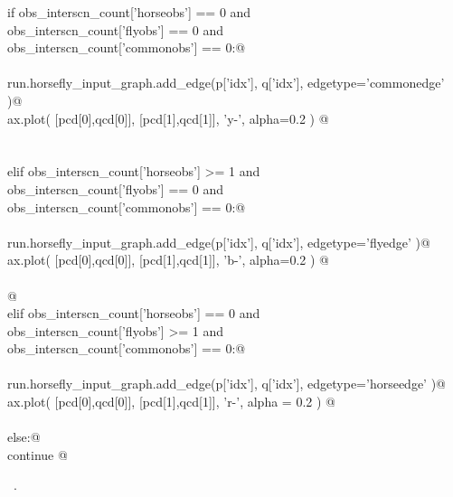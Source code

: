 \documentclass[11.5pt]{report}
\begin{document}
\begin{flushleft}
\begin{minipage}{\linewidth}
\begin{list}{}{}
\mbox{}\verb@             if   obs_interscn_count['horseobs']   == 0  and \@\\
\mbox{}\verb@                obs_interscn_count['flyobs']     == 0  and \@\\
\mbox{}\verb@                obs_interscn_count['commonobs']  == 0:@\\
\mbox{}\verb@@\\
\mbox{}\verb@                run.horsefly_input_graph.add_edge(p['idx'], q['idx'], edgetype='commonedge' )@\\
\mbox{}\verb@                ax.plot( [pcd[0],qcd[0]], [pcd[1],qcd[1]], 'y-',  alpha=0.2 ) @\\
\mbox{}\verb@@\\
\mbox{}\verb@@\\
\mbox{}\verb@             elif obs_interscn_count['horseobs']  >= 1  and \@\\
\mbox{}\verb@                obs_interscn_count['flyobs']      == 0  and \@\\
\mbox{}\verb@                obs_interscn_count['commonobs']   == 0:@\\
\mbox{}\verb@@\\
\mbox{}\verb@                run.horsefly_input_graph.add_edge(p['idx'], q['idx'], edgetype='flyedge' )@\\
\mbox{}\verb@                ax.plot( [pcd[0],qcd[0]], [pcd[1],qcd[1]], 'b-',  alpha=0.2 ) @\\
\mbox{}\verb@@\\
\mbox{}\verb@    @\\
\mbox{}\verb@             elif obs_interscn_count['horseobs']    == 0  and \@\\
\mbox{}\verb@                 obs_interscn_count['flyobs']      >= 1  and \@\\
\mbox{}\verb@                 obs_interscn_count['commonobs']   == 0:@\\
\mbox{}\verb@@\\
\mbox{}\verb@                 run.horsefly_input_graph.add_edge(p['idx'], q['idx'], edgetype='horseedge' )@\\
\mbox{}\verb@                 ax.plot( [pcd[0],qcd[0]], [pcd[1],qcd[1]], 'r-', alpha = 0.2 ) @\\
\mbox{}\verb@@\\
\mbox{}\verb@             else:@\\
\mbox{}\verb@                 continue @\\
\mbox{}\verb@@{\NWsep}
\end{list}
\vspace{-1.5ex}
\footnotesize
\begin{list}{}{\setlength{\itemsep}{-\parsep}\setlength{\itemindent}{-\leftmargin}}
\item \NWtxtMacroRefIn\ .

\item{}
\end{list}
\end{minipage}\vspace{4ex}
\end{flushleft}
\end{document}
